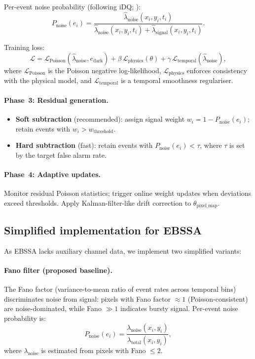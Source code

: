 \documentclass[twocolumn]{article}
\begin{document}
Per-event noise probability (following iDQ; \citealt{D6}):
\begin{equation}
  P_\mathrm{noise}(e_i) = \frac{\hat{\lambda}_\mathrm{noise}(x_i, y_i, t_i)}{\hat{\lambda}_\mathrm{noise}(x_i, y_i, t_i) + \hat{\lambda}_\mathrm{signal}(x_i, y_i, t_i)}.
  \label{eq:pnoise}
\end{equation}

Training loss:
\begin{equation}
  \mathcal{L} = \mathcal{L}_\mathrm{Poisson}(\hat{\lambda}_\mathrm{noise}, e_\mathrm{dark})
  + \beta\,\mathcal{L}_\mathrm{physics}(\theta)
  + \gamma\,\mathcal{L}_\mathrm{temporal}(\hat{\lambda}_\mathrm{noise}),
\end{equation}
where $\mathcal{L}_\mathrm{Poisson}$ is the Poisson negative log-likelihood, $\mathcal{L}_\mathrm{physics}$ enforces consistency with the physical model, and $\mathcal{L}_\mathrm{temporal}$ is a temporal smoothness regulariser.

\paragraph{Phase~3: Residual generation.}
\begin{itemize}
  \item \textbf{Soft subtraction} (recommended): assign signal weight $w_i = 1 - P_\mathrm{noise}(e_i)$; retain events with $w_i > w_\mathrm{threshold}$.
  \item \textbf{Hard subtraction} (fast): retain events with $P_\mathrm{noise}(e_i) < \tau$, where $\tau$ is set by the target false alarm rate.
\end{itemize}

\paragraph{Phase~4: Adaptive updates.}
Monitor residual Poisson statistics; trigger online weight updates when deviations exceed thresholds.
Apply Kalman-filter-like drift correction to $\theta_\mathrm{pixel\_map}$.

\subsection{Simplified implementation for EBSSA}

As EBSSA lacks auxiliary channel data, we implement two simplified variants:

\paragraph{Fano filter (proposed baseline).}
The Fano factor (variance-to-mean ratio of event rates across temporal bins) discriminates noise from signal: pixels with Fano factor $\approx 1$ (Poisson-consistent) are noise-dominated, while Fano $\gg 1$ indicates bursty signal.
Per-event noise probability is:
\begin{equation}
  P_\mathrm{noise}(e_i) = \frac{\lambda_\mathrm{noise}(x_i, y_i)}{\lambda_\mathrm{total}(x_i, y_i)},
\end{equation}
where $\lambda_\mathrm{noise}$ is estimated from pixels with Fano $\leq 2$.
\end{document}
